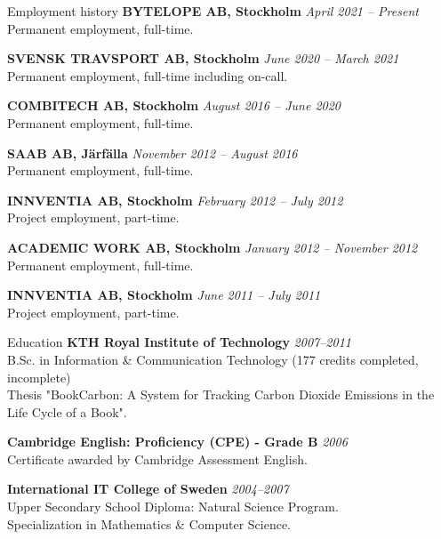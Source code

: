 \documentclass{resume}
\begin{document}
  \begin{rSection}{Employment history}
  {\bf BYTELOPE AB, Stockholm}
    \hfill {\em April 2021 -- Present } \\
    { Permanent employment, full-time. }

    {\bf SVENSK TRAVSPORT AB, Stockholm}
    \hfill {\em June 2020 -- March 2021 } \\
    { Permanent employment, full-time including on-call. }

    {\bf COMBITECH AB, Stockholm}
    \hfill {\em August 2016 -- June 2020 } \\
    { Permanent employment, full-time. }

    {\bf SAAB AB, Järfälla}
    \hfill {\em November 2012 -- August 2016 } \\
    { Permanent employment, full-time. }

    {\bf INNVENTIA AB, Stockholm}
    \hfill {\em February 2012 -- July 2012 } \\
    { Project employment, part-time. }

    {\bf ACADEMIC WORK AB, Stockholm}
    \hfill {\em January 2012 -- November 2012 } \\
    { Permanent employment, full-time. }

    {\bf INNVENTIA AB, Stockholm}
    \hfill {\em June 2011 -- July 2011 } \\
    { Project employment, part-time. }

  \end{rSection}

  \begin{rSection}{Education}
  {\bf KTH Royal Institute of Technology}
    \hfill {\em 2007--2011 } \\
    { B.Sc. in Information \& Communication Technology (177 credits completed, incomplete) } \\
    { Thesis "BookCarbon: A System for Tracking Carbon Dioxide Emissions in the Life Cycle of a Book". }

    {\bf Cambridge English: Proficiency (CPE) - Grade B}
    \hfill {\em 2006 } \\
    { Certificate awarded by Cambridge Assessment English. }

    {\bf International IT College of Sweden}
    \hfill {\em 2004--2007 } \\
    { Upper Secondary School Diploma: Natural Science Program. } \\
    { Specialization in Mathematics \& Computer Science. }
  \end{rSection}
\end{document}
